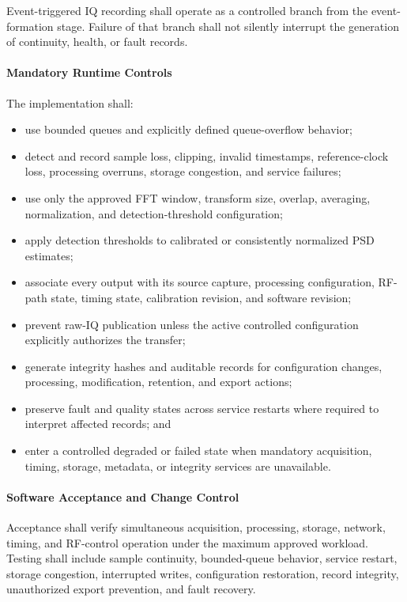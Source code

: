 \documentclass[11pt,a4paper]{article}
\begin{document}
	Event-triggered IQ recording shall operate as a controlled branch from the
	event-formation stage. Failure of that branch shall not silently interrupt the
	generation of continuity, health, or fault records.
	
	\paragraph*{Mandatory Runtime Controls}
	
	The implementation shall:
	
	\begin{itemize}[leftmargin=*]
		\item use bounded queues and explicitly defined queue-overflow behavior;
		\item detect and record sample loss, clipping, invalid timestamps,
		reference-clock loss, processing overruns, storage congestion, and service
		failures;
		\item use only the approved FFT window, transform size, overlap, averaging,
		normalization, and detection-threshold configuration;
		\item apply detection thresholds to calibrated or consistently normalized
		PSD estimates;
		\item associate every output with its source capture, processing
		configuration, RF-path state, timing state, calibration revision, and
		software revision;
		\item prevent raw-IQ publication unless the active controlled
		configuration explicitly authorizes the transfer;
		\item generate integrity hashes and auditable records for configuration
		changes, processing, modification, retention, and export actions;
		\item preserve fault and quality states across service restarts where
		required to interpret affected records; and
		\item enter a controlled degraded or failed state when mandatory
		acquisition, timing, storage, metadata, or integrity services are
		unavailable.
	\end{itemize}
	
	\paragraph*{Software Acceptance and Change Control}
	
	Acceptance shall verify simultaneous acquisition, processing, storage,
	network, timing, and RF-control operation under the maximum approved workload.
	Testing shall include sample continuity, bounded-queue behavior, service
	restart, storage congestion, interrupted writes, configuration restoration,
	record integrity, unauthorized export prevention, and fault recovery.
	
\end{document}
